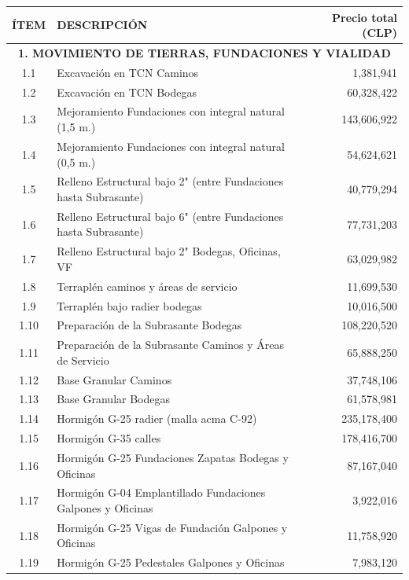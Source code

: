 \documentclass{article} %
\begin{document}
\begin{table}[H]
    \centering
    \begin{tabular}{|c|l|r|}
    \hline
    \textbf{ÍTEM} & \textbf{DESCRIPCIÓN} & \textbf{Precio total (CLP)} \\ \hline
    \multicolumn{3}{|c|}{\textbf{1. MOVIMIENTO DE TIERRAS, FUNDACIONES Y VIALIDAD}} \\ \hline
    1.1 & Excavación en TCN Caminos & 1,381,941 \\ \hline
    1.2 & Excavación en TCN Bodegas & 60,328,422 \\ \hline
    1.3 & Mejoramiento Fundaciones con integral natural (1,5 m.) & 143,606,922 \\ \hline
    1.4 & Mejoramiento Fundaciones con integral natural (0,5 m.) & 54,624,621 \\ \hline
    1.5 & Relleno Estructural bajo 2" (entre Fundaciones hasta Subrasante) & 40,779,294 \\ \hline
    1.6 & Relleno Estructural bajo 6" (entre Fundaciones hasta Subrasante) & 77,731,203 \\ \hline
    1.7 & Relleno Estructural bajo 2" Bodegas, Oficinas, VF & 63,029,982 \\ \hline
    1.8 & Terraplén caminos y áreas de servicio & 11,699,530 \\ \hline
    1.9 & Terraplén bajo radier bodegas & 10,016,500 \\ \hline
    1.10 & Preparación de la Subrasante Bodegas & 108,220,520 \\ \hline
    1.11 & Preparación de la Subrasante Caminos y Áreas de Servicio & 65,888,250 \\ \hline
    1.12 & Base Granular Caminos & 37,748,106 \\ \hline
    1.13 & Base Granular Bodegas & 61,578,981 \\ \hline
    1.14 & Hormigón G-25 radier (malla acma C-92) & 235,178,400 \\ \hline
    1.15 & Hormigón G-35 calles & 178,416,700 \\ \hline
    1.16 & Hormigón G-25 Fundaciones Zapatas Bodegas y Oficinas & 87,167,040 \\ \hline
    1.17 & Hormigón G-04 Emplantillado Fundaciones Galpones y Oficinas & 3,922,016 \\ \hline
    1.18 & Hormigón G-25 Vigas de Fundación Galpones y Oficinas & 11,758,920 \\ \hline
    1.19 & Hormigón G-25 Pedestales Galpones y Oficinas & 7,983,120 \\ \hline

\end{tabular}
\end{table}
\end{document}
